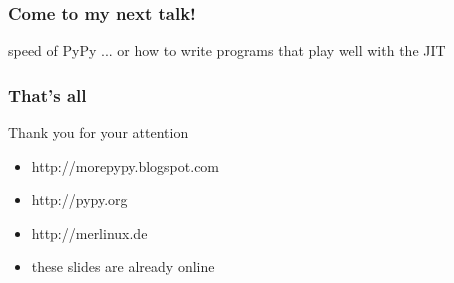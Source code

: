 \documentclass[utf8x, 14pt]{beamer}
\begin{document}
\begin{frame}
  \frametitle{Come to my next talk!}
  \begin{block}{speed of PyPy}
    ... or how to write programs that play well with the JIT
  \end{block}
\end{frame}

\begin{frame}
  \frametitle{That's all}
  Thank you for your attention
  \begin{itemize}
    \item http://morepypy.blogspot.com
    \item http://pypy.org
    \item http://merlinux.de
    \item these slides are already online
  \end{itemize}
\end{frame}
\end{document}
